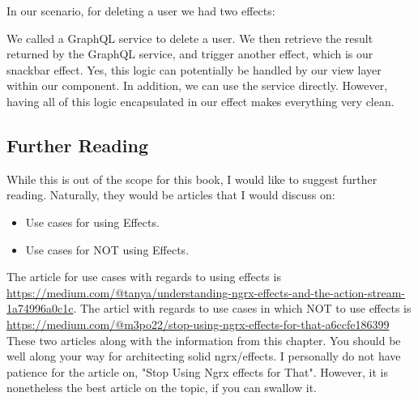 In our scenario, for deleting a user we had two effects:

We called a GraphQL service to delete a user. We then retrieve the result
returned by the GraphQL service, and trigger another effect, which is our
snackbar effect. Yes, this logic can potentially be handled by our view layer
within our component. In addition, we can use the service directly. However,
having all of this logic encapsulated in our effect makes everything very
clean.

\subsection{ Further Reading }
While this is out of the scope for this book, I would like to suggest further
reading. Naturally, they would be articles that I would discuss on:
\begin{itemize}
  \item Use cases for using Effects.
  \item Use cases for NOT using Effects.
\end{itemize}

The article for use cases with regards to using effects is \href{"Understanding NgRx
Effects and the Action Stream"}{https://medium.com/@tanya/understanding-ngrx-effects-and-the-action-stream-1a74996a0c1c}.
The articl with regards to use cases in which NOT to use effects is
\href{Stop using ngrx/effects for that}{https://medium.com/@m3po22/stop-using-ngrx-effects-for-that-a6ccfe186399}
These two articles along with the information from this chapter. You should be
well along your way for architecting solid ngrx/effects. I personally do not
have patience for the article on, "Stop Using Ngrx effects for That". However,
it is nonetheless the best article on the topic, if you can swallow it.
